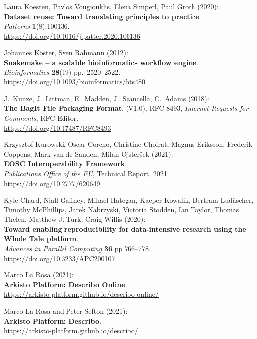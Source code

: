\begin{thebibliography}{9}
Laura Koesten, Pavlos Vougiouklis, Elena Simperl, Paul Groth
(2020):\\
\textbf{Dataset reuse: Toward translating principles to practice}.\\
\emph{Patterns} \textbf{1}(8):100136.\\
\url{https://doi.org/10.1016/j.patter.2020.100136}

Johannes Köster, Sven Rahmann (2012):\\
\textbf{Snakemake -- a scalable bioinformatics workflow engine}.\\
\emph{Bioinformatics} \textbf{28}(19) pp.~2520--2522.\\
\url{https://doi.org/10.1093/bioinformatics/bts480}

J.~Kunze, J.~Littman, E.~Madden, J.~Scancella, C.~Adams
(2018):\\
\textbf{The BagIt File Packaging Format}, (V1.0), RFC 8493,
\emph{Internet Requests for Comments}, RFC Editor.\\
\url{https://doi.org/10.17487/RFC8493}

Krzysztof Kurowski, Oscar Corcho, Christine Choirat, Magnus
Eriksson, Frederik Coppens, Mark van de Sanden, Milan Ojsteršek
(2021):\\
\textbf{EOSC Interoperability Framework}.\\
\emph{Publications Office of the EU}, Technical Report, 2021.\\
\url{https://doi.org/10.2777/620649}

Kyle Chard, Niall Gaffney, Mihael Hategan, Kacper Kowalik,
Bertram Ludäscher, Timothy McPhillips, Jarek Nabrzyski, Victoria
Stodden, Ian Taylor, Thomas Thelen, Matthew J. Turk, Craig Willis
(2020):\\
\textbf{Toward enabling reproducibility for data-intensive research
using the Whole Tale platform}.\\
\emph{Advances in Parallel Computing} \textbf{36} pp 766--778.\\
\url{https://doi.org/10.3233/APC200107}

Marco La Rosa (2021):\\
\textbf{Arkisto Platform: Describo Online}.\\
\url{https://arkisto-platform.github.io/describo-online/}

Marco La Rosa and Peter Sefton (2021):\\
\textbf{Arkisto Platform: Describo}.\\
\url{https://arkisto-platform.github.io/describo/}


\end{thebibliography}
